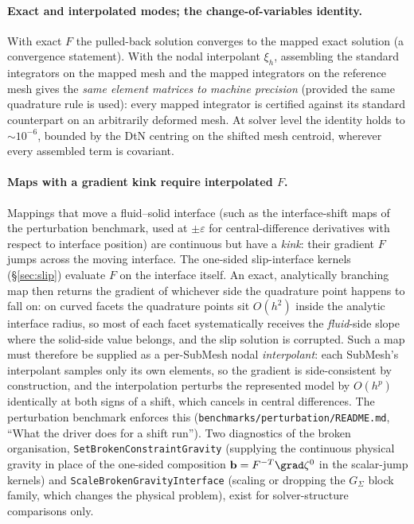 \documentclass[11pt]{article}
\numberwithin{equation}{section}
\theoremstyle{remark}
\newcommand{\eps}{\varepsilon}
\newcommand{\vb}{\mathbf{b}}
\newcommand{\code}[1]{\texttt{#1}}
\begin{document}
\paragraph{Exact and interpolated modes; the change-of-variables
identity.} With exact $F$ the pulled-back solution converges to the mapped
exact solution (a convergence statement). With the nodal interpolant
$\xi_h$, assembling the standard integrators on the mapped mesh and the
mapped integrators on the reference mesh gives the \emph{same element
matrices to machine precision} (provided the same quadrature rule is used):
every mapped integrator is certified against its standard counterpart on an
arbitrarily deformed mesh. At solver level the identity holds to
$\sim10^{-6}$, bounded by the DtN centring on the shifted mesh centroid,
wherever every assembled term is covariant.

\paragraph{Maps with a gradient kink require interpolated $F$.}
\label{sec:shiftmaps}
Mappings that move a fluid--solid interface (such as the interface-shift
maps of the perturbation benchmark, used at $\pm\eps$ for
central-difference derivatives with respect to interface position) are
continuous but have a \emph{kink}: their gradient $F$ jumps across the
moving interface. The one-sided slip-interface kernels (\S\ref{sec:slip})
evaluate $F$ on the interface itself. An exact, analytically branching map
then returns the gradient of whichever side the quadrature point happens
to fall on: on curved facets the quadrature points sit $O(h^2)$ inside the
analytic interface radius, so most of each facet systematically receives
the \emph{fluid}-side slope where the solid-side value belongs, and the
slip solution is corrupted. Such a map must therefore be supplied as a
per-SubMesh nodal \emph{interpolant}: each SubMesh's interpolant samples
only its own elements, so the gradient is side-consistent by
construction, and the interpolation perturbs the represented model by
$O(h^p)$ identically at both signs of a shift, which cancels in central
differences. The perturbation benchmark enforces this
(\code{benchmarks/perturbation/README.md}, ``What the driver does for a
shift run''). Two diagnostics of the broken organisation,
\code{SetBrokenConstraintGravity} (supplying the continuous physical
gravity in place of the one-sided composition $\vb = F^{-T}\grad\zeta^0$
in the scalar-jump kernels) and \code{ScaleBrokenGravityInterface}
(scaling or dropping the $G_\Sigma$ block family, which changes the
physical problem), exist for solver-structure comparisons only.
\end{document}
